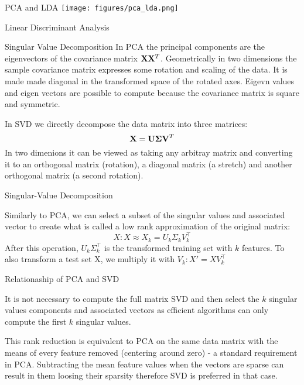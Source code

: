 \documentclass[12pt]{beamer}
\begin{document}
\begin{frame}{PCA and LDA} 
\texttt{[image: figures/pca\_lda.png]}
\end{frame}

\begin{frame}{Linear Discriminant Analysis} 
\end{frame}

\begin{frame}{Singular Value Decomposition} 
In PCA the principal components are the eigenvectors of the covariance
matrix ${\bf X}{\bf X}^{T}$.  Geometrically in two dimensions the
sample covariance matrix expresses some rotation and scaling of the
data. It is made made diagonal in the transformed space of the
rotated axes. Eigevn values and eigen vectors are possible 
to compute because the covariance matrix is square and symmetric. 

In SVD we directly decompose the data matrix into three matrices: 
\[
{\bf X} = {\bf U}{\bf \Sigma} {\bf V}^T 
\]
In two dimenions it can be viewed as taking any arbitray matrix 
and converting it to an orthogonal matrix (rotation), a diagonal matrix (a stretch) and another orthogonal matrix (a second rotation). 
\end{frame} 

\begin{frame}{Singular-Value Decomposition} 

Similarly to PCA, we can select a subset of the singular values and associated 
vector to create what is called a low rank approximation of the original matrix: 
\[
X: X \approx X_k = U_k \Sigma_k V_k^\top 
\]
After this operation, $U_k \Sigma_k^\top$ is the transformed training
set with $k$ features.  To also transform a test set X, we multiply it
with $V_k: X' = X V_k^\top$
\end{frame} 


\begin{frame}{Relationaship of PCA and SVD} 

It is not necessary to compute the full matrix SVD and then select 
the $k$ singular values components and associated vectors as 
efficient algorithms can only compute the first $k$ singular values. 

This rank reduction is equivalent to PCA on the same data matrix with
the means of every feature removed (centering around zero) - a
standard requirement in PCA. Subtracting the mean feature values when the vectors are sparse can result in them loosing their sparsity therefore SVD is preferred in that case. 
\end{frame} 
\end{document}

